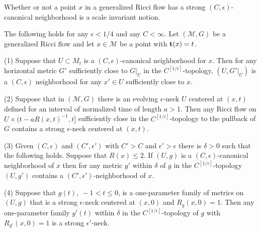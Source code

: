 Whether or not a point $x$ in a generalized Ricci flow has a strong
$(C,\epsilon)$-canonical neighborhood is a scale invariant notion.


\begin{proposition}\label{prop:canonical-neighborhood-stability}
\label{canonvary}
The following holds for any  $\epsilon<1/4$ and any $C<\infty$. Let
$({\mathcal M},G)$ be a generalized Ricci flow and let $x\in
{\mathcal M}$ be a point with ${\bf t}(x)=t$.

(1) Suppose that $U\subset M_t$ is a  $(C,\epsilon)$-canonical
neighborhood for $x$. Then for any horizontal metric $G'$
sufficiently close to $G|_U$ in the $C^{[1/\epsilon]}$-topology,
$(U,G'|_U)$ is a  $(C,\epsilon)$ neighborhood for any $x'\in U$
sufficiently close to $x$.



(2) Suppose that in $({\mathcal M},G)$ there is an evolving
$\epsilon$-neck $U$ centered at $(x,t)$ defined for an interval of
normalized time of length  $a>1$. Then any Ricci flow on $U\times
(t-aR(x,t)^{-1},t]$ sufficiently close in the
$C^{[1/\epsilon]}$-topology to the pullback of $G$ contains a strong
$\epsilon$-neck centered at $(x,t)$.

(3) Given $(C,\epsilon)$ and $(C',\epsilon')$ with $C'>C$ and
$\epsilon'>\epsilon$ there is $\delta>0$ such that the following
holds. Suppose that $R(x)\le 2$. If $(U,g)$ is a
$(C,\epsilon)$-canonical neighborhood of $x$ then for any metric
$g'$ within $\delta$ of $g$ in the $C^{[1/\epsilon]}$-topology
$(U,g')$ contains a $(C',\epsilon')$-neighborhood of $x$.

(4) Suppose that $g(t),\ -1<t\le 0$, is a one-parameter family of
metrics on $(U,g)$ that is a strong $\epsilon$-neck centered at
$(x,0)$ and $R_g(x,0)=1$. Then any one-parameter family $g'(t)$
within $\delta$ in the $C^{[1/\epsilon]}$-topology of $g$ with
$R_{g'}(x,0)=1$ is a strong $\epsilon'$-neck.
\end{proposition}


